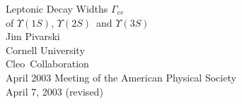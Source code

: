 

\def\ys{$\Upsilon(1S)$}
\def\yss{$\Upsilon(2S)$}
\def\ysss{$\Upsilon(3S)$}
\def\gamee{$\Gamma_{ee}$}
\def\cleo{{\sc Cleo}}
\def\cleoii{{\sc Cleo II}}
\def\cleoiii{{\sc Cleo III}}

\newcommand{\talktitle}[0]{Leptonic Decay Widths \gamee\ of \ys, \yss\ and \ysss}
\newcommand{\fmttitle}[0]{}
\newcommand{\conftitle}[0]{April 2003 Meeting of the American Physical Society}
\newcommand{\myname}[0]{Jim Pivarski}
\newcommand{\affila}[0]{Cornell University}
\newcommand{\talkdate}[0]{April 7, 2003 (revised)}

\pagestyle{conference}   %




\slideheight 7.0in
\slidewidth 8.8in 

\renewcommand{\arraystretch}{0.3}
\renewcommand{\slidetopmargin}{0.4in}
\renewcommand{\slidebottommargin}{0.9in}



\begin{slide*}

\slideframe{}

\begin{center}
\vspace{4 cm}
{\Huge Leptonic Decay Widths \gamee \\
\vspace{0.25 cm}
of \ys, \yss\  and \ysss}  \\
\vspace{1 cm}
{\LARGE	Jim Pivarski } \\
\vspace{0.25 cm}
{\Large	Cornell University } \\
\vspace{1 cm}
{\LARGE	\cleo\  Collaboration } \\
\vspace{2 cm}
\conftitle \\
{\large \talkdate}

\end{center}

\end{slide*}

